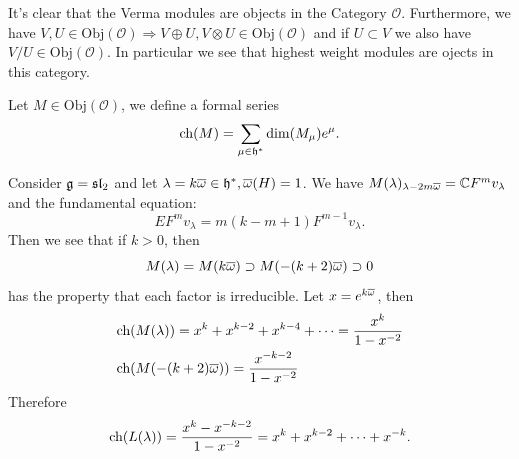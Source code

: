 \begin{itemize}
    It's clear that the Verma modules are objects in the Category $\mathcal{O}$. Furthermore, we have 
    $V,U\in\text{Obj}(\mathcal{O})\Rightarrow V\oplus U,V\otimes U\in\text{Obj}(\mathcal{O})$ and if 
    $U\subset V$ we also have $V/U\in\text{Obj}(\mathcal{O})$. In particular we see that highest weight modules 
    are ojects in this category.\par 
    Let $M\in\text{Obj}(\mathcal{O})$, we define a formal series 
    \begin{equation}
        \text{ch}(M) = \sum_{\mu\in\mathfrak{h}^*}\dim(M_\mu)e^\mu.
    \end{equation}
    \begin{example}
        Consider $\mathfrak{g}=\mathfrak{sl}_2$ and let $\lambda=k\overline{\omega}\in\mathfrak{h}^*,\overline{\omega}(H)=1$. We have 
        $M(\lambda)_{\lambda - 2m\overline{\omega}} = \mathbb{C} F^m v_\lambda$ and the fundamental equation:
        \begin{equation}\label{equation: fundamental equation}
            EF^mv_\lambda = m(k-m+1)F^{m-1}v_\lambda.
        \end{equation} 
        Then we see that if $k>0$, then
        \begin{equation}
          M(\lambda) =  M(k\overline{\omega}) \supset M(-(k+2)\overline{\omega}) \supset 0
        \end{equation}
        has the property that each factor is irreducible. Let $x=e^{k\overline{\omega}}$, then 
        \begin{equation}
            \begin{split}
                &\text{ch}(M(\lambda)) = x^k + x^{k-2} +x^{k-4}+\cdots = \frac{x^k}{1-x^{-2}}\\
                &\text{ch}(M(-(k+2)\overline{\omega})) = \frac{x^{-k-2}}{1-x^{-2}}
            \end{split}
        \end{equation}
        Therefore 
        \begin{equation}
            \text{ch}(L(\lambda)) = \frac{x^k - x^{-k-2}}{1-x^{-2}} = x^{k} + x^{k-2} + \cdots + x^{-k}.
        \end{equation}
    \end{example}
    

\end{itemize}
